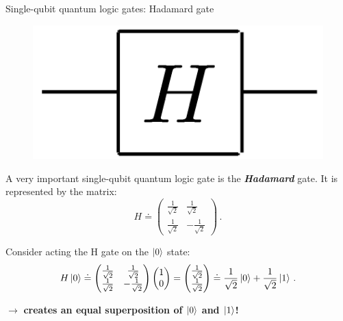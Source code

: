 \documentclass[10pt]{beamer}
\begin{document}
{
\begin{frame}[fragile]{Single-qubit quantum logic gates: Hadamard gate}

\begin{figure}
\includegraphics[scale=0.15]{hcircuit.png}
\end{figure}

A very important single-qubit quantum logic gate is the \textbf{\emph{Hadamard}} gate. It is represented by the matrix:
\begin{equation}
\label{equ:hadamard}
H \doteq \begin{pmatrix}
 \frac{1}{\sqrt{2}} & \frac{1}{\sqrt{2}} \\ 
 \frac{1}{\sqrt{2}} & -\frac{1}{\sqrt{2}}
 \end{pmatrix}\, .
\end{equation}

Consider acting the H gate on the $\ket{0}$ state:
\begin{equation}
H \ket{0}\doteq \begin{pmatrix}
 \frac{1}{\sqrt{2}} & \frac{1}{\sqrt{2}} \\ 
 \frac{1}{\sqrt{2}} & -\frac{1}{\sqrt{2}}
 \end{pmatrix}\begin{pmatrix}
 1 \\ 0 
 \end{pmatrix} = \begin{pmatrix}
 \frac{1}{\sqrt{2}} \\ \frac{1}{\sqrt{2}} 
 \end{pmatrix} \doteq \frac{1}{\sqrt{2}} \ket{0} + \frac{1}{\sqrt{2}} \ket{1}\, .
\end{equation}

$\rightarrow$ \textbf{creates an equal superposition of $\ket{0}$ and $\ket{1}$!}


\end{frame}
}
\end{document}
